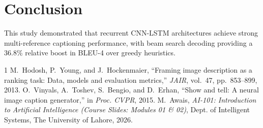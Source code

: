 \documentclass[10pt,journal,compsoc,twocolumn]{IEEEtran}
\begin{document}
\section{Conclusion}
This study demonstrated that recurrent CNN-LSTM architectures achieve strong multi-reference captioning performance, with beam search decoding providing a 36.8\% relative boost in BLEU-4 over greedy heuristics.

\begin{thebibliography}{1}
M.~Hodosh, P.~Young, and J.~Hockenmaier, ``Framing image description as a ranking task: Data, models and evaluation metrics,'' \emph{JAIR}, vol.~47, pp.~853--899, 2013.
O.~Vinyals, A.~Toshev, S.~Bengio, and D.~Erhan, ``Show and tell: A neural image caption generator,'' in \emph{Proc. CVPR}, 2015.
M.~Awais, \emph{AI-101: Introduction to Artificial Intelligence (Course Slides: Modules 01 \& 02)}, Dept. of Intelligent Systems, The University of Lahore, 2026.
\end{thebibliography}
\end{document}
